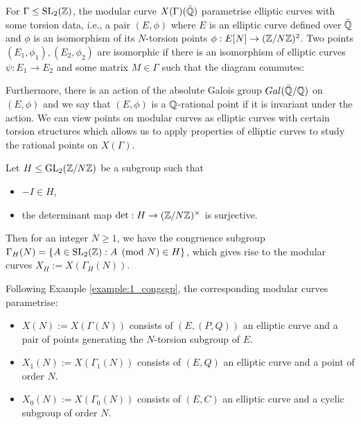 For $\Gamma \leq \operatorname{SL}_2(\mathbb{Z})$, the modular curve $X(\Gamma)(\bar{\mathbb{Q}})$ parametrise elliptic curves with some torsion data, i.e., a pair $(E, \phi)$ where $E$ is an elliptic curve defined over $\bar{\mathbb{Q}}$ and $\phi$ is an isomorphism of its $N$-torsion points $\phi: E[N] \rightarrow (\mathbb{Z}/N\mathbb{Z})^2$. Two points $(E_1,\phi_1), (E_2,\phi_2)$ are isomorphic if there is an isomorphism of elliptic curves $\psi: E_1 \rightarrow E_2$ and some matrix $M \in \Gamma$ such that the diagram commutes:

\begin{center}
\end{center}


Furthermore, there is an action of the absolute Galois group $Gal(\bar{\mathbb{Q}}/\mathbb{Q})$ on $(E,\phi)$ and we say that $(E,\phi)$ is a $\mathbb{Q}$-rational point if it is invariant under the action. We can view points on modular curves as elliptic curves with certain torsion structures which allows us to apply properties of elliptic curves to study the rational points on $X(\Gamma)$.

\begin{example}
Let $H \leq \operatorname{GL}_2(\mathbb{Z}/N\mathbb{Z})$ be a subgroup such that
\begin{itemize}
    \item $-I \in H$,
    \item the determinant map $\det: H \rightarrow (\mathbb{Z}/N\mathbb{Z})^\times$ is surjective.
\end{itemize}
Then for an integer $N \geq 1$, we have the congruence subgroup $\Gamma_H(N) = \{ A \in \operatorname{SL}_2(\mathbb{Z}) : A \pmod{N} \in H \}$, which gives rise to the modular curves $X_H := X(\Gamma_H(N))$.

Following Example \ref{example:1_congsgp}, the corresponding modular curves parametrise:

\begin{itemize}
    \item $X(N):= X(\Gamma(N))$ consists of $(E,(P,Q))$ an elliptic curve and a pair of points generating the $N$-torsion subgroup of $E$.
    \item $X_1(N) := X(\Gamma_1(N))$ consists of $(E,Q)$ an elliptic curve and a point of order $N$.
    \item $X_0(N) := X(\Gamma_0(N))$ consists of $(E,C)$ an elliptic curve and a cyclic subgroup of order $N$.
\end{itemize}
\end{example}

